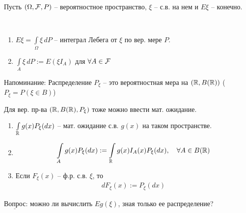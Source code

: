 
Пусть $(\Omega, \mathcal{F}, P)$ -- вероятностное пространство, 
$\xi$ -- с.в. на нем и $E \xi$ -- конечно.

\begin{designations}~

  \begin{enumerate}
    \item 
      $E \xi = \int\limits_{\Omega} \xi\, d P$ -- интеграл Лебега от $\xi$ по вер. мере $P$.

    \item
      $\int\limits_{A} \xi\, d P := E (\xi I_A)$ для $\forall A \in \mathcal{F}$
  \end{enumerate}

\end{designations}

Напоминание: 
Распределение $P_{\xi}$ -- это вероятностная мера на $(\mathbb{R}, B(\mathbb{R}))$
($P_{\xi} = P(\xi \in B)$)

Для вер. пр-ва $(\mathbb{R}, B(\mathbb{R}), P_{\xi})$ тоже можно ввести мат. ожидание.

\begin{enumerate}
  \item
    $\int\limits_{\mathbb{R}} g(x) P_{\xi}(dx)$ -- мат. ожидание с.в. $g(x)$ на таком пространстве.

  \item
    \begin{align*}
      \int\limits_{A} g(x) P_{\xi}(dx) := \int\limits_{\mathbb{R}} g(x) I_{A}(x) P_{\xi}(dx),\quad 
      \forall A \in B(\mathbb{R})
    \end{align*}

  \item
    Если $F_{\xi}(x)$ -- ф.р. с.в. $\xi$, то
    \begin{align*}
      dF_{\xi}(x) := P_{\xi}(dx)
    \end{align*}
\end{enumerate}

$\underline{\text{Вопрос}}$: можно ли вычислить $E g(\xi)$, зная только ее распределение?

